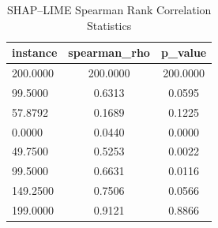 \begin{table}
\centering
\caption{SHAP–LIME Spearman Rank Correlation Statistics}
\label{tab:agreement}
\begin{tabular}{lcc}
\toprule
instance & spearman_rho & p_value \\
\midrule
200.0000 & 200.0000 & 200.0000 \\
99.5000 & 0.6313 & 0.0595 \\
57.8792 & 0.1689 & 0.1225 \\
0.0000 & 0.0440 & 0.0000 \\
49.7500 & 0.5253 & 0.0022 \\
99.5000 & 0.6631 & 0.0116 \\
149.2500 & 0.7506 & 0.0566 \\
199.0000 & 0.9121 & 0.8866 \\
\bottomrule
\end{tabular}
\end{table}
